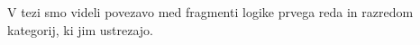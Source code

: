 \documentclass[../kategoricna_logika.tex]{subfiles}
\begin{document}
V tezi smo videli povezavo med fragmenti logike prvega reda in razredom kategorij,
ki jim ustrezajo.
\end{document}
